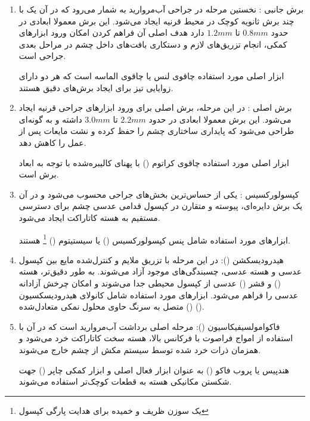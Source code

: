 \documentclass{article}
\begin{document}
\begin{enumerate}
\item برش جانبی :
نخستین مرحله در جراحی آب‌مروارید به شمار می‌رود که در آن یک با چند برش ثانویه کوچک در محیط قرنیه ایجاد می‌شود. این برش‌ معمولا ابعادی در حدود $0.8mm$ تا $1.2mm$ دارد هدف اصلی آن فراهم کردن امکان ورود ابزارهای کمکی، انجام تزریق‌های لازم و دستکاری بافت‌های داخل چشم در مراحل بعدی جراحی است. 

ابزار‌ اصلی مورد استفاده چاقوی لنس  یا چاقوی الماسه  است که هر دو دارای زوایایی تیز برای ایجاد برش‌های دقیق هستند.


\item برش اصلی :
در این مرحله، برش اصلی برای ورود ابزارهای جراحی قرنیه ایجاد می‌شود. این برش معمولا ابعادی در حدود $2.2mm$ تا $3.0mm$ داشته و به گونه‌ای طراحی می‌شود که پایداری ساختاری چشم را حفظ کرده و نشت مایعات پس از عمل را کاهش دهد.

ابزار اصلی مورد استفاده چاقوی کراتوم () با پهنای کالیبره‌شده با توجه به ابعاد برش است.

\item کپسولورکسیس :
یکی از حساس‌ترین بخش‌های جراحی محسوب می‌شود و در آن یک برش دایره‌ای، پیوسته و متقارن در کپسول قدامی عدسی چشم برای دسترسی مستقیم به هسته کاتاراکت ایجاد می‌شود.

ابزارهای مورد استفاده شامل پنس کپسولورکسیس () یا سیستیتوم () \footnote{یک سوزن ظریف و خمیده برای هدایت پارگی کپسول} هستند. 


\item هیدرودیسکشن ():
در این مرحله با تزریق ملایم و کنترل‌شده مایع بین کپسول عدسی و هسته عدسی، چسبندگی‌های موجود آزاد می‌شوند. به طور دقیق‌تر، هسته () و قشر () عدسی از کپسول محیطی جدا می‌شوند و امکان چرخش آزادانه عدسی را فراهم می‌شود.
ابزارهای مورد استفاده شامل کانولای هیدرودیسکسیون () متصل به سرنگ حاوی محلول نمکی متعادل‌شده ().

\item فاکوامولسیفیکاسیون ():
مرحله اصلی برداشت آب‌مروارید است که در آن با استفاده از امواج فراصوت با فرکانس بالا، هسته سخت کاتاراکت خرد می‌شود و همزمان ذرات خرد شده توسط سیستم مکش از چشم خارج می‌شوند. 

هندپیس یا پروب فاکو () به عنوان ابزار فعال اصلی و ابزار کمکی چاپر () جهت شکستن مکانیکی هسته به قطعات کوچک‌تر استفاده می‌شوند.


\end{enumerate}
\end{document}
